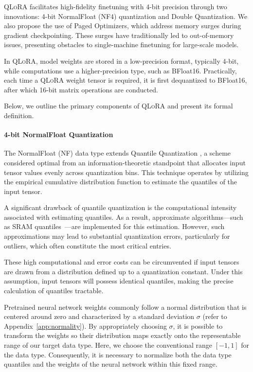 \textsc{QLoRA} facilitates high-fidelity finetuning with 4-bit precision through two innovations: 4-bit NormalFloat (NF4) quantization and Double Quantization. We also propose the use of Paged Optimizers, which address memory surges during gradient checkpointing. These surges have traditionally led to out-of-memory issues, presenting obstacles to single-machine finetuning for large-scale models.

In \textsc{QLoRA}, model weights are stored in a low-precision format, typically 4-bit, while computations use a higher-precision type, such as BFloat16. Practically, each time a \textsc{QLoRA} weight tensor is required, it is first dequantized to BFloat16, after which 16-bit matrix operations are conducted.

Below, we outline the primary components of \textsc{QLoRA} and present its formal definition.

\paragraph{4-bit NormalFloat Quantization} The NormalFloat (NF) data type extends Quantile Quantization \citep{dettmers2022optimizers}, a scheme considered optimal from an information-theoretic standpoint that allocates input tensor values evenly across quantization bins. This technique operates by utilizing the empirical cumulative distribution function to estimate the quantiles of the input tensor.

A significant drawback of quantile quantization is the computational intensity associated with estimating quantiles. As a result, approximate algorithms—such as SRAM quantiles~\citep{dettmers2022optimizers}—are implemented for this estimation. However, such approximations may lead to substantial quantization errors, particularly for outliers, which often constitute the most critical entries.

These high computational and error costs can be circumvented if input tensors are drawn from a distribution defined up to a quantization constant. Under this assumption, input tensors will possess identical quantiles, making the precise calculation of quantiles tractable.

Pretrained neural network weights commonly follow a normal distribution that is centered around zero and characterized by a standard deviation $\sigma$ (refer to Appendix~\ref{app:normality}). By appropriately choosing $\sigma$, it is possible to transform the weights so their distribution maps exactly onto the representable range of our target data type. Here, we choose the conventional range $[-1, 1]$ for the data type. Consequently, it is necessary to normalize both the data type quantiles and the weights of the neural network within this fixed range.

